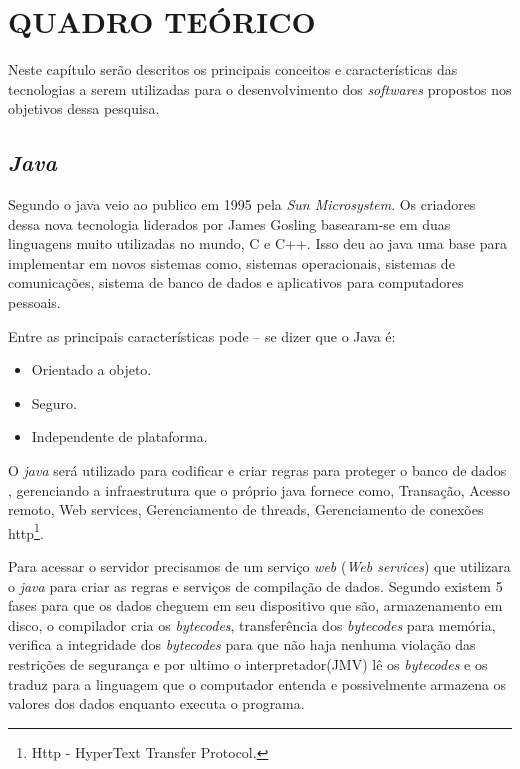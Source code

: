 \chapter{QUADRO TEÓRICO}

	\par Neste capítulo serão descritos os principais conceitos e características
das tecnologias a serem utilizadas para o desenvolvimento dos \textit{softwares}
propostos nos objetivos dessa pesquisa.

\section{\textit{Java}}

	\par Segundo  o java veio ao publico em 1995 pela
\textit{Sun Microsystem}. Os criadores dessa nova tecnologia liderados por
James Gosling basearam-se em duas linguagens muito utilizadas no mundo, C e C++.
Isso deu ao java uma base para implementar em novos sistemas como, sistemas
operacionais, sistemas de comunicações, sistema de banco de dados e aplicativos
para computadores pessoais.

	\par Entre as principais características pode – se dizer que o Java é:
	
	\begin{itemize}

	  \item Orientado a objeto.
	  
	  \item Seguro.
	  
	  \item Independente de plataforma. 

	\end{itemize}
	
	\par {} O \textit{java} será utilizado para codificar e
criar regras para proteger o banco de dados , gerenciando a infraestrutura que
o próprio java fornece como, Transação, Acesso remoto, Web services,
Gerenciamento de threads, Gerenciamento de conexões http\footnote{Http -
HyperText Transfer Protocol.}.

	\par Para acessar o servidor precisamos de um serviço \textit{web} (\textit{Web
services}) que utilizara o \textit{java} para criar as regras e serviços de
compilação de dados. Segundo  existem 5 fases para que os dados
cheguem em seu dispositivo que são, armazenamento em disco, o compilador cria os
\textit{bytecodes}, transferência dos \textit{bytecodes} para memória, verifica
a integridade dos \textit{bytecodes} para que não haja nenhuma violação das
restrições de segurança e por ultimo o interpretador(JMV) lê os
\textit{bytecodes} e os traduz para a linguagem que o computador entenda e
possivelmente armazena os valores dos dados enquanto executa o programa.

